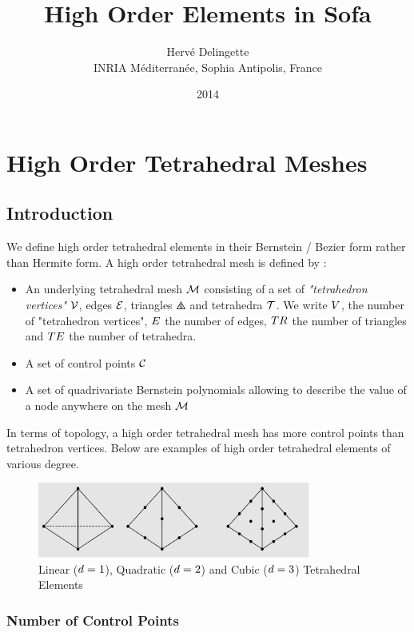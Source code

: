 \documentclass[a4paper,11pt]{article}
\title{High Order Elements in Sofa}
\date{2014}
\author{Herv\'e Delingette\\ {\small INRIA M\'editerran\'ee, Sophia Antipolis, France}}
\begin{document}
 
\maketitle
\section{High Order Tetrahedral Meshes}

\subsection{Introduction}

We define high order tetrahedral elements in their Bernstein / Bezier form rather than Hermite form. 
A high order tetrahedral mesh is defined by :

\begin{itemize}
	\item An underlying tetrahedral mesh ${\mathcal M}$ consisting of a set of {\em "tetrahedron vertices"} ${\mathcal V}$, edges ${\mathcal E}$, triangles $\triangles$ and tetrahedra ${\mathcal T}$. We write ${ V}$, the number of "tetrahedron vertices", ${ E}$ the number of edges, ${ TR}$ the number of triangles and ${ TE}$ the number of tetrahedra. 
	\item A set of control points ${\mathcal C}$
	\item A set of quadrivariate Bernstein polynomials  allowing to describe the value of a node anywhere on the mesh ${\mathcal M}$ 
\end{itemize}
%

In terms of topology, a high order tetrahedral mesh has more control points than tetrahedron vertices.
Below are examples of high order tetrahedral elements of various degree.
\begin{figure}[!htbp]
	\centering
    \includegraphics[width=0.80\textwidth]{HighOrderTetra}
	\caption{Linear (${d}=1$), Quadratic (${d}=2$) and Cubic (${d}=3$) Tetrahedral Elements}
	\label{fig:LinearQuadraticAndCubicTetrahedralElements}
\end{figure}


\subsubsection{Number of Control Points}
\end{document}
